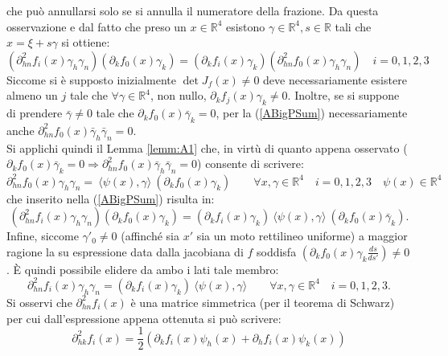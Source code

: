 che può annullarsi solo se si annulla il numeratore della frazione. Da questa osservazione e dal fatto che preso un $x\in \mathbb{R}^4 $ esistono $ \gamma \in\mathbb{R}^4, s \in \mathbb{R}$ tali che $x=\xi+s\gamma$ si ottiene:
\begin{equation}
    \left(\partial^2_{hn}f_i(x)\gamma_h\gamma_n\right)\left(\partial_kf_0(x)\gamma_k\right)
    = \left(\partial_kf_i(x)\gamma_k\right)\left(\partial^2_{hn}f_0(x)\gamma_h\gamma_n\right) \quad i=0,1,2,3  
    \label{ABigPSum}
\end{equation}
Siccome si è supposto inizialmente $\det J_f(x)\neq 0$ deve necessariamente esistere almeno un $j$ tale che $ \forall\gamma\in \mathbb{R}^4$, non nullo, $\partial_kf_j(x)\gamma_k\neq 0$. Inoltre, se si suppone di prendere $\bar{\gamma}\neq0$ tale che $\partial_kf_0(x)\bar{\gamma}_k=0$, per la (\ref{ABigPSum}) necessariamente anche $\partial^2_{hn}f_0(x)\bar{\gamma}_h\bar{\gamma}_n=0$.\\

Si applichi quindi il Lemma \ref{lemm:A1} che, in virtù di quanto appena osservato ($\partial_kf_0(x)\bar{\gamma}_k=0\Rightarrow \partial^2_{hn}f_0(x)\bar{\gamma}_h\bar{\gamma}_n=0$) consente di scrivere:
\begin{equation*}
    \partial^2_{hn}f_0(x)\gamma_h\gamma_n=\ \langle \psi(x),\gamma\rangle\ (\partial_kf_0(x)\gamma_k) \qquad   \forall x,\gamma\in \mathbb{R}^4 \quad i=0,1,2,3 \quad \psi(x)\in\mathbb{R}^4
\end{equation*}
che inserito nella (\ref{ABigPSum}) risulta in:
\begin{equation*}
    \left(\partial^2_{hn}f_i(x)\gamma_h\gamma_n\right)\left(\partial_kf_0(x)\gamma_k\right)
    = \left(\partial_kf_i(x)\gamma_k\right)\ \langle \psi(x),\gamma\rangle\ (\partial_kf_0(x)\bar{\gamma}_k).
\end{equation*}
Infine, siccome $\gamma'_0\neq 0$ (affinché sia $x'$ sia un moto rettilineo uniforme) a maggior ragione la su espressione data dalla jacobiana di $f$ soddisfa $(\partial_kf_0(x)\gamma_k\frac{ds}{ds'})\neq 0$. È quindi possibile elidere da ambo i lati tale membro:
\begin{equation}
    \partial^2_{hn}f_i(x)\gamma_h\gamma_n=\left(\partial_kf_i(x)\gamma_k\right)\ \langle \psi(x),\gamma\rangle \qquad   \forall x,\gamma\in \mathbb{R}^4 \quad i=0,1,2,3.
    \label{APArtialScal}
\end{equation}
Si osservi che  $\partial^2_{hn}f_i(x)$ è una matrice simmetrica (per il teorema di Schwarz) per cui dall'espressione appena ottenuta si può scrivere:
\begin{equation}
    \partial^2_{hk}f_i(x)=\frac{1}{2}\left(\partial_kf_i(x)\psi_h(x)+\partial_hf_i(x)\psi_k(x)\right)
    \label{APArtialScalSimm}
\end{equation}


